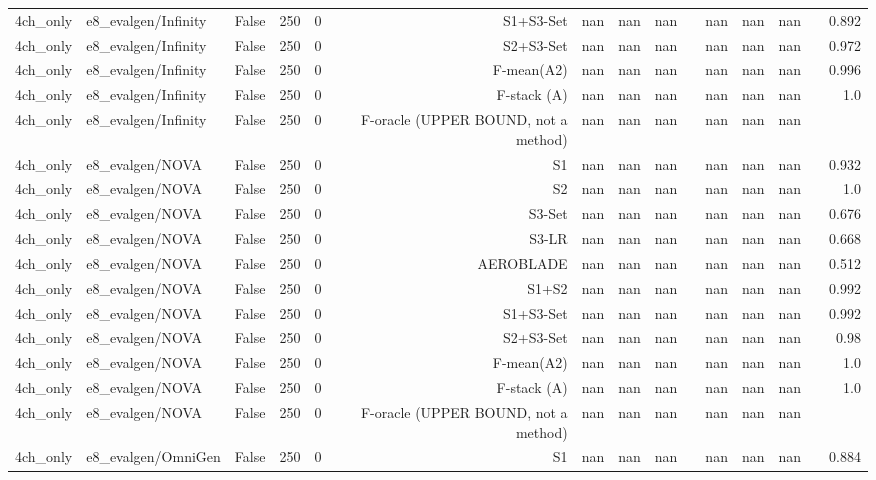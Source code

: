 \begin{table}[htbp]
\begin{tabular}{llrrrrrrrrrrrrr}
4ch\_only & e8\_evalgen/Infinity & False & 250 & 0 & S1+S3-Set & nan & nan & nan &  & nan & nan & nan &  & 0.892 \\
4ch\_only & e8\_evalgen/Infinity & False & 250 & 0 & S2+S3-Set & nan & nan & nan &  & nan & nan & nan &  & 0.972 \\
4ch\_only & e8\_evalgen/Infinity & False & 250 & 0 & F-mean(A2) & nan & nan & nan &  & nan & nan & nan &  & 0.996 \\
4ch\_only & e8\_evalgen/Infinity & False & 250 & 0 & F-stack (A) & nan & nan & nan &  & nan & nan & nan &  & 1.0 \\
4ch\_only & e8\_evalgen/Infinity & False & 250 & 0 & F-oracle (UPPER BOUND, not a method) & nan & nan & nan &  & nan & nan & nan &  &  \\
4ch\_only & e8\_evalgen/NOVA & False & 250 & 0 & S1 & nan & nan & nan &  & nan & nan & nan &  & 0.932 \\
4ch\_only & e8\_evalgen/NOVA & False & 250 & 0 & S2 & nan & nan & nan &  & nan & nan & nan &  & 1.0 \\
4ch\_only & e8\_evalgen/NOVA & False & 250 & 0 & S3-Set & nan & nan & nan &  & nan & nan & nan &  & 0.676 \\
4ch\_only & e8\_evalgen/NOVA & False & 250 & 0 & S3-LR & nan & nan & nan &  & nan & nan & nan &  & 0.668 \\
4ch\_only & e8\_evalgen/NOVA & False & 250 & 0 & AEROBLADE & nan & nan & nan &  & nan & nan & nan &  & 0.512 \\
4ch\_only & e8\_evalgen/NOVA & False & 250 & 0 & S1+S2 & nan & nan & nan &  & nan & nan & nan &  & 0.992 \\
4ch\_only & e8\_evalgen/NOVA & False & 250 & 0 & S1+S3-Set & nan & nan & nan &  & nan & nan & nan &  & 0.992 \\
4ch\_only & e8\_evalgen/NOVA & False & 250 & 0 & S2+S3-Set & nan & nan & nan &  & nan & nan & nan &  & 0.98 \\
4ch\_only & e8\_evalgen/NOVA & False & 250 & 0 & F-mean(A2) & nan & nan & nan &  & nan & nan & nan &  & 1.0 \\
4ch\_only & e8\_evalgen/NOVA & False & 250 & 0 & F-stack (A) & nan & nan & nan &  & nan & nan & nan &  & 1.0 \\
4ch\_only & e8\_evalgen/NOVA & False & 250 & 0 & F-oracle (UPPER BOUND, not a method) & nan & nan & nan &  & nan & nan & nan &  &  \\
4ch\_only & e8\_evalgen/OmniGen & False & 250 & 0 & S1 & nan & nan & nan &  & nan & nan & nan &  & 0.884 \\

\end{tabular}
\end{table}
